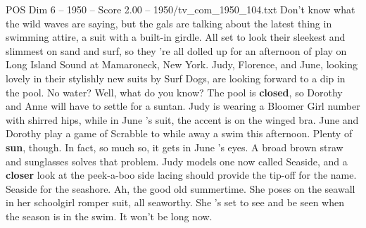 \begin{textsample}{POS Dim 6 – 1950 – Score 2.00 – 1950/tv\_com\_1950\_104.txt}  \label{ex:f6_pos_008}
Don't know what the wild waves are saying, but the gals are talking about the latest thing in swimming attire, a suit with a built-in girdle.
All set to look their sleekest and slimmest on sand and surf, so they 're all dolled up for an afternoon of play on Long Island Sound at Mamaroneck, New York.
Judy, Florence, and June, looking lovely in their stylishly new suits by Surf Dogs, are looking forward to a dip in the pool.
No water?
Well, what do you know?
The pool is \textbf{closed}, so Dorothy and Anne will have to settle for a suntan.
Judy is wearing a Bloomer Girl number with shirred hips, while in June 's suit, the accent is on the winged bra.
June and Dorothy play a game of Scrabble to while away a swim this afternoon.
Plenty of \textbf{sun}, though.
In fact, so much so, it gets in June 's eyes.
A broad brown straw and sunglasses solves that problem.
Judy models one now called Seaside, and a \textbf{closer} look at the peek-a-boo side lacing should provide the tip-off for the name.
Seaside for the seashore.
Ah, the good old summertime.
She poses on the seawall in her schoolgirl romper suit, all seaworthy.
She 's set to see and be seen when the season is in the swim.
It won't be long now.

\end{textsample}
